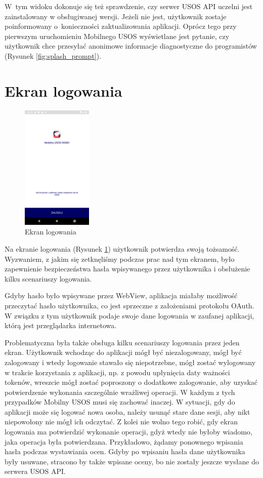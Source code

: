 \documentclass{pracamgr}
\begin{document}
W~tym widoku dokonuje się też sprawdzenie,
czy serwer USOS API uczelni jest zainstalowany w obsługiwanej wersji.
Jeżeli nie jest, użytkownik zostaje poinformowany o~konieczności zaktualizowania
aplikacji. Oprócz tego przy pierwszym uruchomieniu Mobilnego USOS wyświetlane jest
pytanie, czy użytkownik chce przesyłać anonimowe informacje diagnostyczne do programistów 
(Rysunek \ref{fig:splash_prompt}).


\section{Ekran logowania}

\begin{figure}[p]
	\centering
	\includegraphics[width=0.3\textwidth]{img/login.png}
	
	\caption{Ekran logowania}\label{fig:login}
	\medskip
\end{figure}

Na ekranie logowania (Rysunek \ref{fig:login}) użytkownik potwierdza swoją tożsamość. Wyzwaniem, z jakim się
zetknęliśmy podczas prac nad tym ekranem, było zapewnienie bezpieczeństwa hasła
wpisywanego przez użytkownika i obsłużenie kilku scenariuszy logowania.

Gdyby hasło było wpisywane przez WebView, aplikacja miałaby możliwość przeczytać hasło
użytkownika, co jest sprzeczne z założeniami protokołu OAuth. W związku z tym
użytkownik podaje swoje dane logowania w zaufanej aplikacji, którą jest przeglądarka
internetowa.

Problematyczna była także obsługa kilku scenariuszy logowania przez jeden ekran.
Użytkownik wchodząc do aplikacji mógł być niezalogowany, mógł być zalogowany i
wtedy logowanie stawało się niepotrzebne, mógł zostać wylogowany w trakcie korzystania
z aplikacji, np. z powodu upłynięcia daty ważności tokenów, wreszcie mógł zostać
poproszony o dodatkowe zalogowanie, aby uzyskać potwierdzenie wykonania szczególnie
wrażliwej operacji. W każdym z tych przypadków Mobilny USOS musi się zachować
inaczej. W sytuacji, gdy do aplikacji może się logować nowa osoba, należy usunąć
stare dane sesji, aby nikt niepowołony nie mógł ich odczytać. Z kolei nie wolno
tego robić, gdy ekran logowania ma potwierdzić wykonanie operacji, gdyż wtedy
nie byłoby wiadomo, jaka operacja była potwierdzana. Przykładowo, żądamy ponownego
wpisania hasła podczas wystawiania ocen. Gdyby po wpisaniu hasła dane użytkownika
były usuwane, stracono by także wpisane oceny, bo nie zostały jeszcze wysłane
do serwera USOS API.
\end{document}
